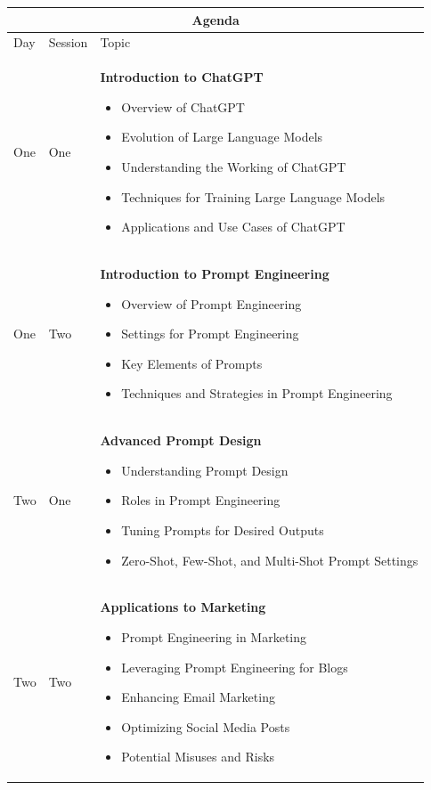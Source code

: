 \documentclass[a4paper, 11pt]{article}
\begin{document}
\begin{center} 
\begin{tabular}{ |p{1cm}|p{1cm}||p{10cm}|  }
 \hline
 \multicolumn{3}{|c|}{\textbf{\large Agenda}} \\
 \hline
Day & Session & Topic\\
 \hline
 One   &  One    &  \textbf{Introduction to ChatGPT}
\begin{itemize}[itemsep=0pt]
\item Overview of ChatGPT
\item Evolution of Large Language Models
\item Understanding the Working of ChatGPT
\item Techniques for Training Large Language Models
\item Applications and Use Cases of ChatGPT
\end{itemize} 
\\
One &   Two  &   \textbf{Introduction to Prompt Engineering}
 \begin{itemize}[itemsep=0pt]
\item Overview of Prompt Engineering
\item Settings for Prompt Engineering
\item Key Elements of Prompts
\item Techniques and Strategies in Prompt Engineering
\end{itemize} 
\\
Two   &  One    & \textbf{Advanced Prompt Design}
 \begin{itemize}[itemsep=0pt]
\item Understanding Prompt Design
\item Roles in Prompt Engineering
\item Tuning Prompts for Desired Outputs
\item Zero-Shot, Few-Shot, and Multi-Shot Prompt Settings
\end{itemize} 
\\
Two  &   Two  & \textbf{Applications to Marketing}
 \begin{itemize}[itemsep=0pt]
\item Prompt Engineering in Marketing
\item Leveraging Prompt Engineering for Blogs
\item Enhancing Email Marketing
\item Optimizing Social Media Posts 
\item Potential Misuses and Risks 
\end{itemize} 


\\
 \hline
\end{tabular}
\end{center}
\end{document}
